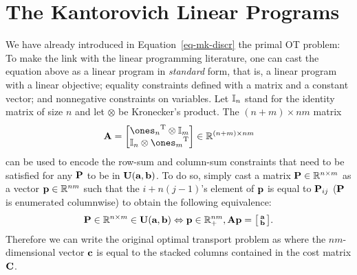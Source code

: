 \section{The Kantorovich Linear Programs}\label{s-kantorovich}
We have already introduced in Equation~\eqref{eq-mk-discr} the primal OT problem:
To make the link with the linear programming literature, one can cast the equation above as a linear program in \emph{standard} form, that is, a linear program with a linear objective; equality constraints defined with a matrix and a constant vector; and nonnegative constraints on variables. Let $\Identity_n$ stand for the identity matrix of size $n$ and let $\otimes$ be Kronecker's product. The ${(n+m) \times nm}$ matrix
$$
\mathbf{A}= \begin{bmatrix}
	\transp{\ones_{n}} \otimes \Identity_m \\
	\Identity_n \otimes \transp{\ones_{m}}
\end{bmatrix}\in\RR^{(n+m)\times nm}
$$
can be used to encode the row-sum and column-sum constraints that need to be satisfied for any $\P$ to be in $\CouplingsD(\a,\b)$. To do so, simply cast a matrix $\P\in\RR^{n\times m}$ as a vector $\p\in\RR^{nm}$ such that the $i+n(j-1)$'s element of $\p$ is equal to $\P_{ij}$ ($\P$ is enumerated columnwise) to obtain the following equivalence:
$$\P\in \RR^{n\times m}\in \CouplingsD(\a,\b) \Leftrightarrow \p\in\RR^{nm}_+, \mathbf{A}\p = \bigl[\begin{smallmatrix}\a\\ \b \end{smallmatrix} \bigr].$$
Therefore we can write the original optimal transport problem as
where the $nm$-dimensional vector $\cc$ is equal to the stacked columns contained in the cost matrix $\C$. 

